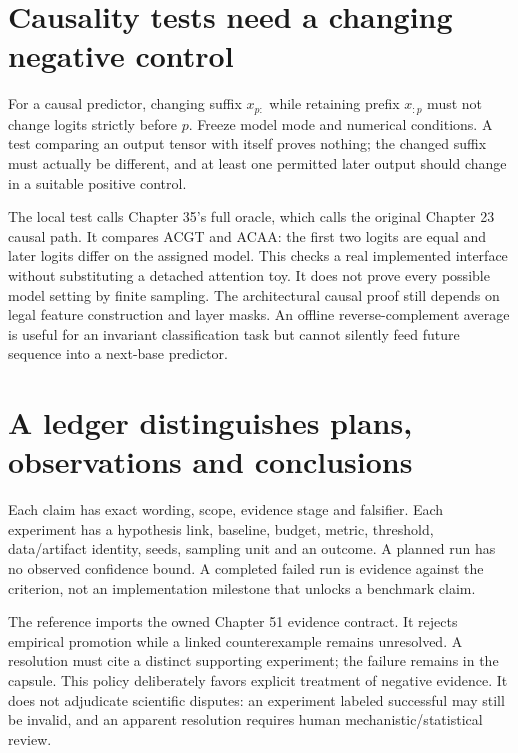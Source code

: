 \section{Causality tests need a changing negative control}
For a causal predictor, changing suffix $x_{p:}$ while retaining prefix
$x_{:p}$ must not change logits strictly before $p$. Freeze model mode and
numerical conditions. A test comparing an output tensor with itself proves
nothing; the changed suffix must actually be different, and at least one
permitted later output should change in a suitable positive control.

The local test calls Chapter 35's full oracle, which calls the original
Chapter 23 causal path. It compares ACGT and ACAA: the first two logits are
equal and later logits differ on the assigned model. This checks a real
implemented interface without substituting a detached attention toy. It does
not prove every possible model setting by finite sampling. The architectural
causal proof still depends on legal feature construction and layer masks.
An offline reverse-complement average is useful for an invariant classification
task but cannot silently feed future sequence into a next-base predictor.

\section{A ledger distinguishes plans, observations and conclusions}
Each claim has exact wording, scope, evidence stage and falsifier. Each
experiment has a hypothesis link, baseline, budget, metric, threshold,
data/artifact identity, seeds, sampling unit and an outcome. A planned run has
no observed confidence bound. A completed failed run is evidence against the
criterion, not an implementation milestone that unlocks a benchmark claim.

The reference imports the owned Chapter 51 evidence contract. It rejects
empirical promotion while a linked counterexample remains unresolved. A
resolution must cite a distinct supporting experiment; the failure remains in
the capsule. This policy deliberately favors explicit treatment of negative
evidence. It does not adjudicate scientific disputes: an experiment labeled
successful may still be invalid, and an apparent resolution requires human
mechanistic/statistical review.

